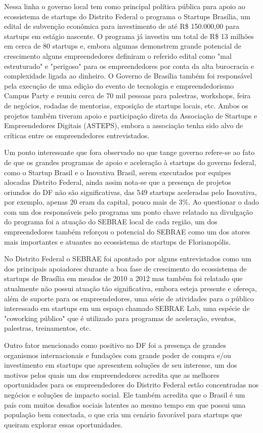 Nessa linha o governo local tem como principal política pública para apoio ao ecossistema de startups do Distrito Federal o programa o Startups Brasília, um edital de subvenção econômica para investimento de até R\$ 150.000,00 para startups em estágio nascente. O programa já investiu um total de R\$ 13 milhões em cerca de 80 startups e, embora algumas demonstrem grande potencial de crescimento alguns empreendedores definiram o referido edital como "mal estruturado" e "perigoso" para os empreendedores por conta da alta burocracia e complexidade ligada ao dinheiro. O Governo de Brasília também foi responsável pela execução de uma edição do evento de tecnologia e empreendedorismo Campus Party e reuniu cerca de 70 mil pessoas para palestras, workshops, feira de negócios, rodadas de mentorias, exposição de startups locais, etc. Ambos os projetos também tiveram apoio e participação direta da Associação de Startups e Empreendedores Digitais (ASTEPS), embora a associação tenha sido alvo de críticas entre os empreendedores entrevistados.

Um ponto interessante que fora observado no que tange governo refere-se ao fato de que os grandes programas de apoio e aceleração à startups do governo federal, como o Startup Brasil e o Inovativa Brasil, serem executados por equipes alocadas Distrito Federal, ainda assim nota-se que a presença de projetos oriundos do DF não são significativas, das 549 startups aceleradas pelo Inovativa, por exemplo, apenas 20 eram da capital, pouco mais de 3\%. Ao questionar o dado com um dos responsáveis pelo programa um ponto chave relatado na divulgação do programa foi a atuação do SEBRAE local de cada região, um dos empreendedores também reforçou o potencial do SEBRAE como um dos atores mais importantes e atuantes no ecossistema de startups de Florianopólis.

No Distrito Federal o SEBRAE foi apontado por alguns entrevistados como um dos principais apoiadores durante a boa fase de crescimento do ecossistema de startups de Brasília em meados de 2010 a 2012 mas também foi relatado que atualmente não possui atuação tão significativa, embora esteja presente e ofereça, além de suporte para os empreendedores, uma série de atividades para o público interessado em startups em um espaço chamado SEBRAE Lab, uma espécie de "coworking público" que é utilizado para programas de aceleração, eventos, palestras, treinamentos, etc. 

Outro fator mencionado como positivo no DF foi a presença de grandes organismos internacionais e fundações com grande poder de compra e/ou investimento em startups que apresentem soluções de seu interesse, um dos motivos pelos quais um dos empreendedores acredita que as melhores oportunidades para os empreendedores do Distrito Federal estão concentradas nos negócios e soluções de impacto social. Ele também acredita que o Brasil é um país com muitos desafios sociais latentes ao mesmo tempo em que possui uma população bem conectada, o que cria um cenário favorável para startups que queiram explorar essas oportunidades.

